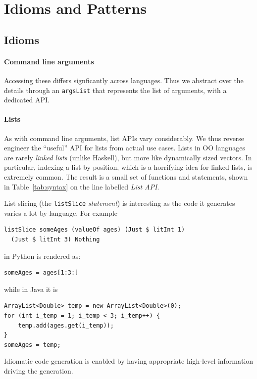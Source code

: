 \documentclass[sigplan,screen,10pt]{acmart}
\begin{document}
\section{Idioms and Patterns} \label{sec:patterns}

\subsection{Idioms}

\paragraph{Command line arguments} Accessing these differs
signficantly across languages.  Thus we abstract over the details through an
\verb|argsList| that represents the list of arguments, with a dedicated API.

\paragraph{Lists}
As with command line arguments, list APIs vary considerably.
We thus reverse engineer the ``useful'' API for lists from actual
use cases.
Lists in OO languages are rarely \emph{linked lists} (unlike Haskell), but
more like dynamically sized vectors. In particular, indexing a list by
position, which is a horrifying idea for linked lists, is extremely common.
The result is a small set of functions and statements, shown in
Table~\ref{tab:syntax} on the line labelled \emph{List API}.

List slicing (the \verb|listSlice|
\emph{statement}) is interesting as the code it generates varies
a lot by language.  For example
\begin{lstlisting}
listSlice someAges (valueOf ages) (Just $ litInt 1) 
  (Just $ litInt 3) Nothing
\end{lstlisting}
in Python is rendered as:
\begin{lstlisting}
someAges = ages[1:3:]
\end{lstlisting}
while in Java it is
\begin{lstlisting}
ArrayList<Double> temp = new ArrayList<Double>(0);
for (int i_temp = 1; i_temp < 3; i_temp++) {
    temp.add(ages.get(i_temp));
}
someAges = temp;
\end{lstlisting}
Idiomatic code generation is enabled by having
appropriate high-level information driving the generation.
\end{document}
